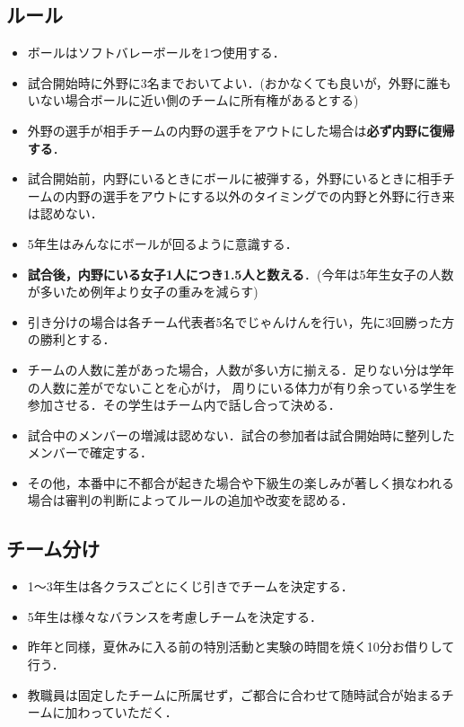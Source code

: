 \documentclass[dvipdfmx]{jsarticle}
\begin{document}
\subsection{ルール}
\begin{itemize}
  \item ボールはソフトバレーボールを1つ使用する．
  \item 試合開始時に外野に3名までおいてよい．(おかなくても良いが，外野に誰もいない場合ボールに近い側のチームに所有権があるとする)
  \item 外野の選手が相手チームの内野の選手をアウトにした場合は{\bf 必ず内野に復帰する}．
  \item 試合開始前，内野にいるときにボールに被弾する，外野にいるときに相手チームの内野の選手をアウトにする以外のタイミングでの内野と外野に行き来は認めない．
  \item 5年生はみんなにボールが回るように意識する．
  \item {\bf 試合後，内野にいる女子1人につき1.5人と数える}．(今年は5年生女子の人数が多いため例年より女子の重みを減らす)
  \item 引き分けの場合は各チーム代表者5名でじゃんけんを行い，先に3回勝った方の勝利とする．
  \item チームの人数に差があった場合，人数が多い方に揃える．足りない分は学年の人数に差がでないことを心がけ，
        周りにいる体力が有り余っている学生を参加させる．その学生はチーム内で話し合って決める．
  \item 試合中のメンバーの増減は認めない．試合の参加者は試合開始時に整列したメンバーで確定する．
  \item その他，本番中に不都合が起きた場合や下級生の楽しみが著しく損なわれる場合は審判の判断によってルールの追加や改変を認める．
\end{itemize}

\subsection{チーム分け}\label{team}
\begin{itemize}
  \item 1～3年生は各クラスごとにくじ引きでチームを決定する．
  \item 5年生は様々なバランスを考慮しチームを決定する．
  \item 昨年と同様，夏休みに入る前の特別活動と実験の時間を焼く10分お借りして行う．
  \item 教職員は固定したチームに所属せず，ご都合に合わせて随時試合が始まるチームに加わっていただく．
\end{itemize}
\end{document}
